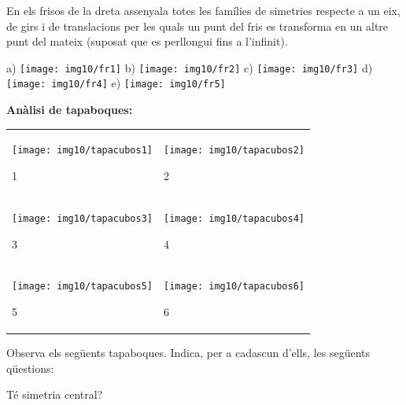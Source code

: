 \begin{mylist}
\exer  En els frisos de la dreta assenyala totes les famílies de simetries respecte a un eix, de girs i de translacions per les quals un punt del fris es transforma en un altre punt del mateix (suposat que es perllongui fins a l'infinit).

a) \texttt{[image: img10/fr1]}
 b)   \texttt{[image: img10/fr2]}
 c)   \texttt{[image: img10/fr3]}
 d) \texttt{[image: img10/fr4]}
  e)  \texttt{[image: img10/fr5]}



\exer \simbolsearch \textbf{Anàlisi de tapaboques:} 

\begin{minipage}{0.4\textwidth}
	\begin{center}
		\centering
		\begin{tabular}{p{1in} p{1in}}
			\texttt{[image: img10/tapacubos1]}\par 1 &
			\texttt{[image: img10/tapacubos2]}\par 2 \\
			\texttt{[image: img10/tapacubos3]}\par 3 &
			\texttt{[image: img10/tapacubos4]}\par 4 \\
			\texttt{[image: img10/tapacubos5]}\par 5 &
			\texttt{[image: img10/tapacubos6]}\par 6 \\
		\end{tabular}
	\end{center}
\end{minipage}
\begin{minipage}{0.5\textwidth}
	
	Observa els següents tapaboques. Indica, per a cadascun d'ells, les següents qüestions: 
	\vspace{0.25cm}
	
	\begin{tasks}
		\task Té simetria central?
		

\end{tasks}
\end{minipage}
\end{mylist}
